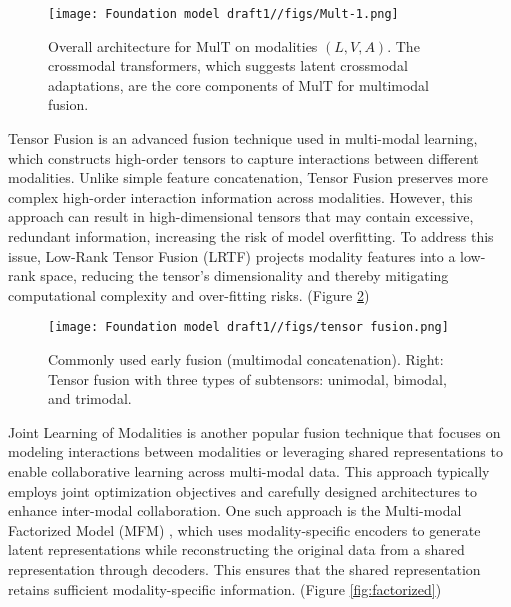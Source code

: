 \documentclass{article}
\begin{document}
\begin{figure}[h]
    \centering
    \texttt{[image: Foundation model draft1//figs/Mult-1.png]}
    \caption{Overall architecture for MulT on modalities $(L,V,A)$. The crossmodal transformers, which suggests latent crossmodal adaptations, are the core components of MulT for multimodal fusion. \cite{tsai-etal-2019-multimodal}}
    \label{fig:mult-1}
\end{figure}

Tensor Fusion \cite{zadeh-etal-2017-tensor} is an advanced fusion technique used in multi-modal learning, which constructs high-order tensors to capture interactions between different modalities. Unlike simple feature concatenation, Tensor Fusion preserves more complex high-order interaction information across modalities. However, this approach can result in high-dimensional tensors that may contain excessive, redundant information, increasing the risk of model overfitting. To address this issue, Low-Rank Tensor Fusion (LRTF) \cite{Liu2018EfficientLM} projects modality features into a low-rank space, reducing the tensor's dimensionality and thereby mitigating computational complexity and over-fitting risks. (Figure \ref{fig:tensor-fusion})

\begin{figure}[h]
    \centering
    \texttt{[image: Foundation model draft1//figs/tensor fusion.png]}
    \caption{Commonly used early fusion (multimodal concatenation). Right: Tensor fusion with three types of subtensors: unimodal, bimodal, and trimodal. \cite{zadeh-etal-2017-tensor}}
    \label{fig:tensor-fusion}
\end{figure}

Joint Learning of Modalities is another popular fusion technique that focuses on modeling interactions between modalities or leveraging shared representations to enable collaborative learning across multi-modal data. This approach typically employs joint optimization objectives and carefully designed architectures to enhance inter-modal collaboration. One such approach is the Multi-modal Factorized Model (MFM) \cite{FactorizedMult}, which uses modality-specific encoders to generate latent representations while reconstructing the original data from a shared representation through decoders. This ensures that the shared representation retains sufficient modality-specific information. (Figure \ref{fig:factorized})
\end{document}
